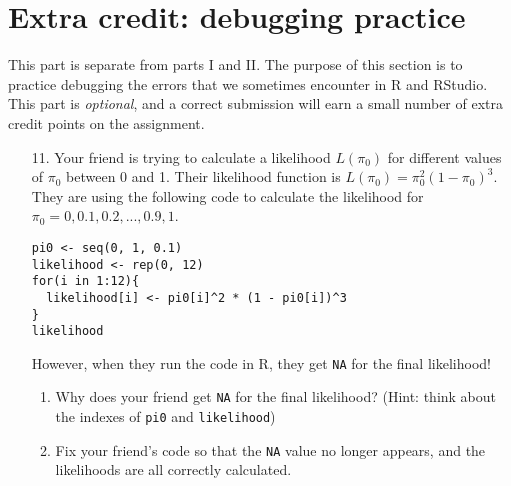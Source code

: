 \documentclass[11pt]{article}
\begin{document}
\section{Extra credit: debugging practice}

This part is separate from parts I and II. The purpose of this section is to practice debugging the errors that we sometimes encounter in R and RStudio. This part is \textit{optional}, and a correct submission will earn a small number of extra credit points on the assignment.

\begin{enumerate}
\item[11.] Your friend is trying to calculate a likelihood $L(\pi_0)$ for different values of $\pi_0$ between 0 and 1. Their likelihood function is $L(\pi_0) = \pi_0^2 (1 - \pi_0)^3$. They are using the following code to calculate the likelihood for $\pi_0 = 0, 0.1, 0.2, ..., 0.9, 1$.

\begin{verbatim}
pi0 <- seq(0, 1, 0.1)
likelihood <- rep(0, 12)
for(i in 1:12){
  likelihood[i] <- pi0[i]^2 * (1 - pi0[i])^3
}
likelihood
\end{verbatim}

However, when they run the code in R, they get \verb;NA; for the final likelihood! 

\begin{enumerate}
\item Why does your friend get \verb;NA; for the final likelihood? (Hint: think about the indexes of \verb;pi0; and \verb;likelihood;)

\item Fix your friend's code so that the \verb;NA; value no longer appears, and the likelihoods are all correctly calculated.
\end{enumerate}

\end{enumerate}
\end{document}
